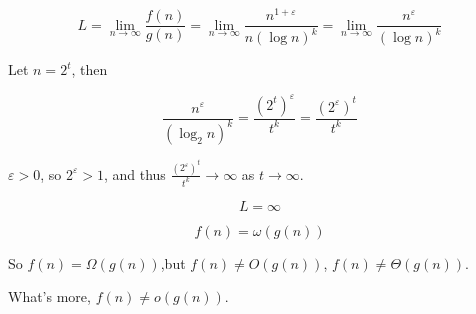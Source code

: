 \begin{parts}
\begin{solution}
$$
L
= \lim_{n\to\infty} \frac{f(n)}{g(n)}
= \lim_{n\to\infty} \frac{n^{1+\varepsilon}}{n(\log n)^k}
= \lim_{n\to\infty} \frac{n^{\varepsilon}}{(\log n)^k}
$$

Let $n=2^t$, then

$$
\frac{n^{\varepsilon}}{(\log_2 n)^k}
= \frac{(2^t)^\varepsilon}{t^k}
= \frac{(2^\varepsilon)^t}{t^k}
$$

$\varepsilon > 0$, so $2^\varepsilon > 1$, and thus $\frac{(2^\varepsilon)^t}{t^k} \to \infty$ as $t \to \infty$.

$$
L = \infty
$$

$$
f(n) = \omega(g(n))
$$

So $f(n) = \Omega(g(n))$,but $f(n) \neq O(g(n))$, $f(n) \neq \Theta(g(n))$.

What's more, $f(n) \neq o(g(n))$.

\end{solution}
\end{parts}
